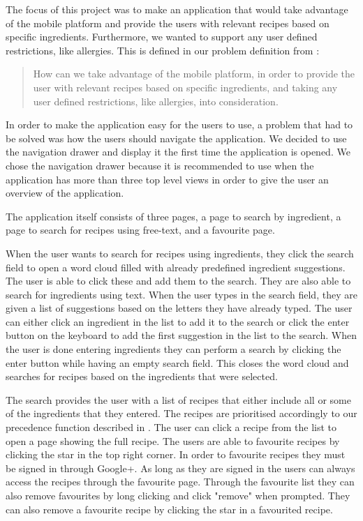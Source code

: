 The focus of this project was to make an application that would take advantage of the mobile platform and provide the users with relevant recipes based on specific ingredients. Furthermore, we wanted to support any user defined restrictions, like allergies.
This is defined in our problem definition from :
\begin{quote}
How can we take advantage of the mobile platform, in order to provide the user with relevant recipes based on specific ingredients, and taking any user defined restrictions, like allergies, into consideration.
\end{quote}
In order to make the application easy for the users to use, a problem that had to be solved was how the users should navigate the application. We decided to use the navigation drawer and display it the first time the application is opened. We chose the navigation drawer because it is recommended to use when the application has more than three top level views in order to give the user an overview of the application.

The application itself consists of three pages, a page to search by ingredient, a page to search for recipes using free-text, and a favourite page. 

When the user wants to search for recipes using ingredients, they click the search field to open a word cloud filled with already predefined ingredient suggestions. The user is able to click these and add them to the search. They are also able to search for ingredients using text. When the user types in the search field, they are given a list of suggestions based on the letters they have already typed. The user can either click an ingredient in the list to add it to the search or click the enter button on the keyboard to add the first suggestion in the list to the search. When the user is done entering ingredients they can perform a search by clicking the enter button while having an empty search field. This closes the word cloud and searches for recipes based on the ingredients that were selected. 

The search provides the user with a list of recipes that either include all or some of the ingredients that they entered. The recipes are prioritised accordingly to our precedence function described in . The user can click a recipe from the list to open a page showing the full recipe. The users are able to favourite recipes by clicking the star in the top right corner. In order to favourite recipes they must be signed in through Google+. As long as they are signed in the users can always access the recipes through the favourite page. Through the favourite list they can also remove favourites by long clicking and click "remove" when prompted. They can also remove a favourite recipe by clicking the star in a favourited recipe.

